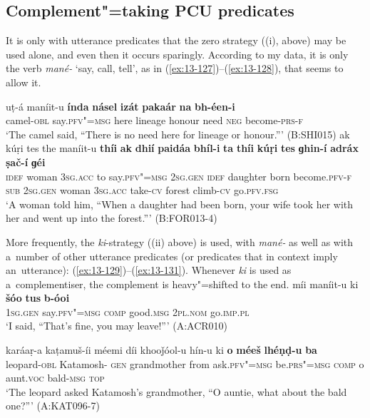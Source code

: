 \subsection{Complement"=taking PCU predicates}
\label{subsec:13-5-1}

 It is only with utterance predicates that the zero strategy ((i), above) may be used alone, and even then it occurs sparingly. According to my data, it is only the verb \textit{mané-} `say, call, tell', as in (\ref{ex:13-127})--(\ref{ex:13-128}), that seems to allow it.

\ea
\label{ex:13-127}
\gll uṭ-á maníit-u \textbf{índa} \textbf{násel} \textbf{izát} \textbf{pakaár} \textbf{na} \textbf{bh-éen-i}\\
camel-\textsc{obl} say.\textsc{pfv"=msg} here lineage honour need \textsc{neg} become-\textsc{prs-f}\\
\glt `The camel said, ``There is no need here for lineage or honour.''' (B:SHI015)
\ex
\label{ex:13-128}
\gll ak kúṛi tes the maníit-u \textbf{thíi} \textbf{ak} \textbf{dhií} \textbf{paidáa} \textbf{bhíl-i} \textbf{ta} \textbf{thíi} \textbf{kúṛi} \textbf{tes} \textbf{ɡhin-í} \textbf{adráx} \textbf{ṣač-í} \textbf{ɡéi}\\
\textsc{idef} woman \textsc{3sg.acc} to say.\textsc{pfv"=msg} \textsc{2sg.gen} \textsc{idef} daughter born become.\textsc{pfv-f} \textsc{sub} \textsc{2sg.gen} woman \textsc{3sg.acc} take-\textsc{cv} forest climb-\textsc{cv} go.\textsc{pfv.fsg}\\
\glt `A woman told him, ``When a daughter had been born, your wife took her with her and went up into the forest.''' (B:FOR013-4) 
\z

More frequently, the \textit{ki}-strategy ((ii) above) is used, with \textit{mané-} as well as with a~number of other utterance predicates (or predicates that in context imply an~utterance): (\ref{ex:13-129})--(\ref{ex:13-131}). Whenever \textit{ki} is used as a~complementiser, the complement is heavy"=shifted to the end.
\largerpage
\ea
\label{ex:13-129}
\gll míi maníit-u ki \textbf{šóo} \textbf{tus} \textbf{b-óoi}  \\
\textsc{1sg.gen} say.\textsc{pfv"=msg} \textsc{comp} good.\textsc{msg} \textsc{2pl.nom} go.\textsc{imp.pl} \\
\glt `I said, ``That's fine, you may leave!''' (A:ACR010)

\ex
\label{ex:13-130}
\gll karáaṛ-a kaṭamuš-íi méemi díi khooǰóol-u hín-u ki \textbf{o} \textbf{méeš} \textbf{lhéṇḍ-u} \textbf{ba}\\
leopard-\textsc{obl} Katamosh-\textsc{ gen} grandmother from ask.\textsc{pfv"=msg} be.\textsc{prs"=msg} \textsc{comp} o aunt.\textsc{voc} bald-\textsc{msg} \textsc{top}\\
\glt `The leopard asked Katamosh's grandmother, ``O auntie, what about the bald one?''' (A:KAT096-7)

